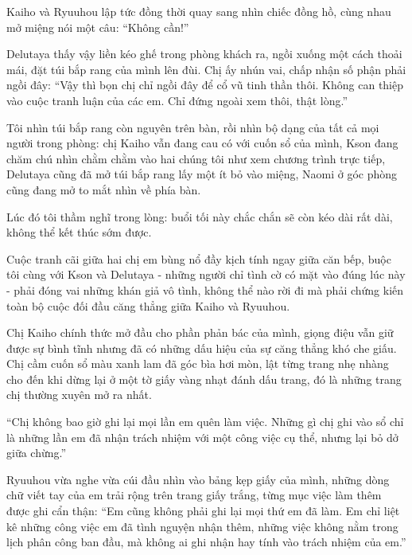 \documentclass[../main.tex]{subfiles}
\begin{document}
Kaiho và Ryuuhou lập tức đồng thời quay sang nhìn chiếc đồng hồ, cùng nhau mở miệng nói một câu: ``Không cần!''

Delutaya thấy vậy liền kéo ghế trong phòng khách ra, ngồi xuống một cách thoải mái, đặt túi bắp rang của mình lên đùi. Chị ấy nhún vai, chấp nhận số phận phải ngồi đây: ``Vậy thì bọn chị chỉ ngồi đây để cổ vũ tinh thần thôi. Không can thiệp vào cuộc tranh luận của các em. Chỉ đứng ngoài xem thôi, thật lòng.''

Tôi nhìn túi bắp rang còn nguyên trên bàn, rồi nhìn bộ dạng của tất cả mọi người trong phòng: chị Kaiho vẫn đang cau có với cuốn sổ của mình, Kson đang chăm chú nhìn chằm chằm vào hai chúng tôi như xem chương trình trực tiếp, Delutaya cũng đã mở túi bắp rang lấy một ít bỏ vào miệng, Naomi ở góc phòng cũng đang mở to mắt nhìn về phía bàn.

Lúc đó tôi thầm nghĩ trong lòng: buổi tối này chắc chắn sẽ còn kéo dài rất dài, không thể kết thúc sớm được.

\ct

Cuộc tranh cãi giữa hai chị em bùng nổ đầy kịch tính ngay giữa căn bếp, buộc tôi cùng với Kson và Delutaya - những người chỉ tình cờ có mặt vào đúng lúc này - phải đóng vai những khán giả vô tình, không thể nào rời đi mà phải chứng kiến toàn bộ cuộc đối đầu căng thẳng giữa Kaiho và Ryuuhou.

Chị Kaiho chính thức mở đầu cho phần phản bác của mình, giọng điệu vẫn giữ được sự bình tĩnh nhưng đã có những dấu hiệu của sự căng thẳng khó che giấu. Chị cầm cuốn sổ màu xanh lam đã góc bìa hơi mòn, lật từng trang nhẹ nhàng cho đến khi dừng lại ở một tờ giấy vàng nhạt đánh dấu trang, đó là những trang chị thường xuyên mở ra nhất.

``Chị không bao giờ ghi lại mọi lần em quên làm việc. Những gì chị ghi vào sổ chỉ là những lần em đã nhận trách nhiệm với một công việc cụ thể, nhưng lại bỏ dở giữa chừng.''

Ryuuhou vừa nghe vừa cúi đầu nhìn vào bảng kẹp giấy của mình, những dòng chữ viết tay của em trải rộng trên trang giấy trắng, từng mục việc làm thêm được ghi cẩn thận: ``Em cũng không phải ghi lại mọi thứ em đã làm. Em chỉ liệt kê những công việc em đã tình nguyện nhận thêm, những việc không nằm trong lịch phân công ban đầu, mà không ai ghi nhận hay tính vào trách nhiệm của em.''


\end{document}
